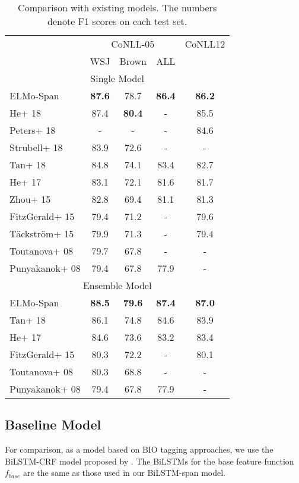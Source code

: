 \documentclass[11pt,a4paper]{article}
\begin{document}
\begin{table}[t]
  \centering
  {\small
  \begin{tabular}{lcccc} \toprule
  		   & \multicolumn{3}{c}{CoNLL-05} & CoNLL12 \\
                  & WSJ & Brown & ALL & \\ \hline \hline
                  \multicolumn{5}{c}{\sc Single Model} \\ \hline
{\sc ELMo-Span}       & {\bf 87.6} & 78.7 & {\bf 86.4} & {\bf 86.2} \\
He+ 18 & 87.4 & {\bf 80.4} & - & 85.5 \\
Peters+ 18   & - & - & - & 84.6 \\
Strubell+ 18 & 83.9 & 72.6 & - & - \\
Tan+ 18   & 84.8 & 74.1 & 83.4 & 82.7 \\ 
He+ 17     & 83.1 & 72.1 & 81.6 & 81.7 \\ 
Zhou+ 15  & 82.8 & 69.4 & 81.1 & 81.3 \\ 
FitzGerald+ 15  & 79.4 & 71.2 & - & 79.6 \\
T\"{a}ckstr\"{o}m+ 15 & 79.9 & 71.3 & - & 79.4 \\
Toutanova+ 08 & 79.7 & 67.8 &  - & - \\ 
Punyakanok+ 08 & 79.4 & 67.8 & 77.9 & -\\ \toprule
                  \multicolumn{5}{c}{\sc Ensemble Model} \\ \hline
{\sc ELMo-Span}       & {\bf 88.5} & {\bf 79.6} & {\bf 87.4} & {\bf 87.0} \\
Tan+ 18   & 86.1 & 74.8 & 84.6 & 83.9 \\ 
He+ 17 & 84.6 & 73.6 & 83.2 & 83.4 \\ 
FitzGerald+ 15  & 80.3 & 72.2 & - & 80.1 \\
Toutanova+ 08 & 80.3 & 68.8 &  - & -\\ 
Punyakanok+ 08 & 79.4 & 67.8 & 77.9 & -\\ \toprule
  \end{tabular}
  }
  \caption{\label{tab:result:comparison} Comparison with existing models. The numbers denote F1 scores on each test set.}
\end{table}

\subsection{Baseline Model}
For comparison, as a model based on BIO tagging approaches, we use the BiLSTM-CRF model proposed by .
The BiLSTMs for the base feature function $f_{base}$ are the same as those used in our BiLSTM-span model.
\vspace{-0.1cm}
\end{document}
